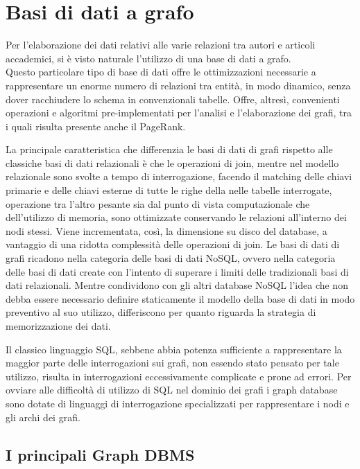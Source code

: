 \documentclass[a4paper,12pt]{article}
\let\oldsection\section
\renewcommand\section{\clearpage\oldsection}
\begin{document}
\section{Basi di dati a grafo}
Per l'elaborazione dei dati relativi alle varie relazioni tra autori e articoli accademici, si è visto naturale l'utilizzo di una base di dati a grafo. \\
Questo particolare tipo di base di dati offre le ottimizzazioni necessarie a rappresentare un enorme numero di relazioni tra entità, in modo dinamico, senza dover racchiudere lo schema in convenzionali tabelle. Offre, altresì, convenienti operazioni e algoritmi pre-implementati per l'analisi e l'elaborazione dei grafi, tra i quali risulta presente anche il PageRank.
\par
La principale caratteristica che differenzia le basi di dati di grafi rispetto alle classiche basi di dati relazionali è che le operazioni di join, mentre nel modello relazionale sono svolte a tempo di interrogazione, facendo il matching delle chiavi primarie e delle chiavi esterne di tutte le righe della nelle tabelle interrogate, operazione tra l'altro pesante sia dal punto di vista computazionale che dell'utilizzo di memoria, sono ottimizzate conservando le relazioni all'interno dei nodi stessi. Viene incrementata, così, la dimensione su disco del database, a vantaggio di una ridotta complessità delle operazioni di join.
Le basi di dati di grafi ricadono nella categoria delle basi di dati NoSQL, ovvero nella categoria delle basi di dati create con l'intento di superare i limiti delle tradizionali basi di dati relazionali. Mentre condividono con gli altri database NoSQL l'idea che non debba essere necessario definire staticamente il modello della base di dati in modo preventivo al suo utilizzo, differiscono per quanto riguarda la strategia di memorizzazione dei dati.
\par
Il classico linguaggio SQL, sebbene abbia potenza sufficiente a rappresentare la maggior parte delle interrogazioni sui grafi, non essendo stato pensato per tale utilizzo, risulta in interrogazioni eccessivamente complicate e prone ad errori. Per ovviare alle difficoltà di utilizzo di SQL nel dominio dei grafi i graph database sono dotate di linguaggi di interrogazione specializzati per rappresentare i nodi e gli archi dei grafi.

\subsection{I principali Graph DBMS}
\end{document}
